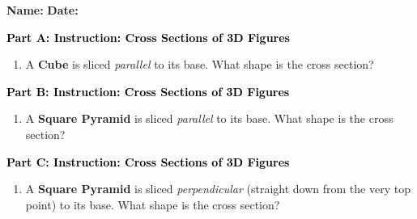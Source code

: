 \documentclass[12pt, letterpaper, fleqn]{article}
\begin{document}
\textbf{Name:} \underline{\hspace{5cm}}
\hfill
\textbf{Date:} \underline{\hspace{3cm}}\\

\begin{tcolorbox}[colback=customteal!20]
\large\textcolor{black}{\textbf{Part A: Instruction: Cross Sections of 3D Figures}}
\end{tcolorbox}

\vspace{3mm}

\begin{enumerate}[itemsep=2.2cm, leftmargin=0.6cm]
\item A \textbf{Cube} is sliced \textit{parallel} to its base. What shape is the cross section?
\end{enumerate}

\newpage

\begin{tcolorbox}[colback=customteal!20]
\large\textcolor{black}{\textbf{Part B: Instruction: Cross Sections of 3D Figures}}
\end{tcolorbox}

\vspace{3mm}

\begin{enumerate}[itemsep=2.2cm, leftmargin=0.6cm, resume]
\item A \textbf{Square Pyramid} is sliced \textit{parallel} to its base. What shape is the cross section?
\end{enumerate}

\newpage

\begin{tcolorbox}[colback=customteal!20]
\large\textcolor{black}{\textbf{Part C: Instruction: Cross Sections of 3D Figures}}
\end{tcolorbox}

\vspace{3mm}

\begin{enumerate}[itemsep=2.2cm, leftmargin=0.6cm, resume]
\item A \textbf{Square Pyramid} is sliced \textit{perpendicular} (straight down from the very top point) to its base. What shape is the cross section?
\end{enumerate}
\end{document}
